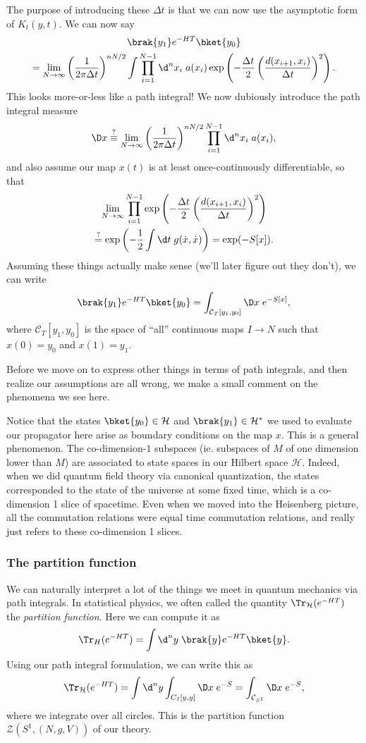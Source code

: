 \documentclass[a4paper]{article}
\begin{document}
The purpose of introducing these $\Delta t$ is that we can now use the asymptotic form of $K_t(y, t)$. We can now say
\begin{multline*}
  \brak{y_1} e^{-HT} \bket{y_0} \\
  = \lim_{N \to \infty} \left(\frac{1}{2\pi \Delta t}\right)^{nN/2} \int \prod_{i = 1}^{N - 1} \d^n x_i\; a(x_i) \exp\left(- \frac{\Delta t}{2}\left(\frac{d(x_{i + 1}, x_i)}{\Delta t}\right)^2\right).
\end{multline*}
This looks more-or-less like a path integral! We now dubiously introduce the path integral measure
\[
  \D x \overset{?}{\equiv} \lim_{N \to \infty} \left(\frac{1}{2\pi \Delta t}\right)^{nN/2} \prod_{i = 1}^{N - 1} \d^n x_i\; a(x_i),
\]
and also assume our map $x(t)$ is at least once-continuously differentiable, so that
\begin{multline*}
  \lim_{N \to \infty} \prod_{i = 1}^{N - 1} \exp\left(-\frac{\Delta t}{2} \left(\frac{d(x_{i + 1}, x_i)}{\Delta t}\right)^2 \right)\\
  \overset{?}{=} \exp\left(-\frac{1}{2} \int \d t\; g(\dot{x}, \dot{x})\right) = \exp(-S[x]).
\end{multline*}
Assuming these things actually make sense (we'll later figure out they don't), we can write
\[
  \brak{y_1} e^{-HT} \bket{y_0} = \int_{\mathcal{C}_T[y_1, y_0]} \D x\; e^{-S[x]},
\]
where $\mathcal{C}_T[y_1, y_0]$ is the space of ``all'' continuous maps $I \to N$ such that $x(0) = y_0$ and $x(1) = y_1$.

Before we move on to express other things in terms of path integrals, and then realize our assumptions are all wrong, we make a small comment on the phenomena we see here.

Notice that the states $\bket{y_0} \in \mathcal{H}$ and $\brak{y_1} \in \mathcal{H}^*$ we used to evaluate our propagator here arise as boundary conditions on the map $x$. This is a general phenomenon. The co-dimension-$1$ subspaces (ie. subspaces of $M$ of one dimension lower than $M$) are associated to state spaces in our Hilbert space $\mathcal{H}$. Indeed, when we did quantum field theory via canonical quantization, the states corresponded to the state of the universe at some fixed time, which is a co-dimension 1 slice of spacetime. Even when we moved into the Heisenberg picture, all the commutation relations were equal time commutation relations, and really just refers to these co-dimension 1 slices.

\subsubsection*{The partition function}
We can naturally interpret a lot of the things we meet in quantum mechanics via path integrals. In statistical physics, we often called the quantity $\Tr_\mathcal{H} (e^{-HT})$ the \emph{partition function}. Here we can compute it as
\[
  \Tr_H(e^{-HT}) = \int \d^n y\; \brak{y}e^{-HT} \bket{y}.
\]
Using our path integral formulation, we can write this as
\[
  \Tr_\mathcal{H} (e^{-HT}) = \int \d^n y \int_{C_I[y, y]} \D x\; e^{-S} = \int_{\mathcal{C}_{S^1}} \D x\; e^{-S},
\]
where we integrate over all circles. This is the partition function $\mathcal{Z}(S^1, (N, g, V))$ of our theory.
\end{document}
